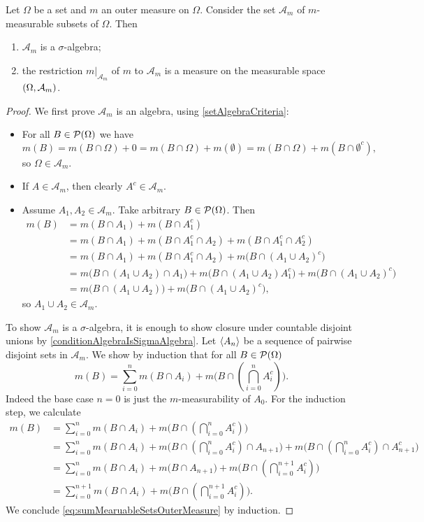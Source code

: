 \begin{theorem}
Let $\Omega$ be a set and $m$ an outer measure on $\Omega$. Consider the set $\mathcal{A}_m$ of $m$-measurable subsets of $\Omega$. Then
\begin{enumerate}
\item $\mathcal{A}_m$ is a $\sigma$-algebra;
\item the restriction $m|_{\mathcal{A}_m}$ of $m$ to $\mathcal{A}_m$ is a measure on the measurable space $\left( \Omega,\mathcal{A}_m \right)$.
\end{enumerate}
\end{theorem}
\begin{proof}
We first prove $\mathcal{A}_m$ is an algebra, using \ref{setAlgebraCriteria}:
\begin{itemize}
\item For all $B\in \operatorname{\mathcal{P}}(\Omega)$ we have
\[ m(B) = m(B\cap \Omega) + 0 = m(B\cap \Omega) + m(\emptyset) = m(B\cap \Omega) + m(B\cap \emptyset^c), \]
so $\Omega\in \mathcal{A}_m$.
\item If $A\in \mathcal{A}_m$, then clearly $A^c\in \mathcal{A}_m$.
\item Assume $A_1,A_2 \in \mathcal{A}_m$. Take arbitrary $B\in\operatorname{\mathcal{P}}(\Omega)$. Then
\begin{align*}
m(B) &= m(B\cap A_1) + m(B\cap A_1^c) \\
&= m(B\cap A_1) + m(B\cap A_1^c\cap A_2) + m(B\cap A_1^c\cap A_2^c) \\
&= m(B\cap A_1) + m(B\cap A_1^c\cap A_2) + m\big(B\cap (A_1\cup A_2)^c\big) \\
&= m\big(B\cap (A_1\cup A_2)\cap A_1\big) + m\big(B\cap (A_1\cup A_2)A_1^c\big) + m\big(B\cap (A_1\cup A_2)^c\big) \\
&= m\big(B\cap (A_1\cup A_2)\big) + m\big(B\cap (A_1\cup A_2)^c\big),
\end{align*}
so $A_1\cup A_2\in \mathcal{A}_m$.
\end{itemize}
To show $\mathcal{A}_m$ is a $\sigma$-algebra, it is enough to show closure under countable disjoint unions by \ref{conditionAlgebraIsSigmaAlgebra}. Let $\left\langle A_n \right\rangle$ be a sequence of pairwise disjoint sets in $\mathcal{A}_m$. We show by induction that for all $B\in \operatorname{\mathcal{P}}(\Omega)$
\begin{equation} m(B) = \sum_{i=0}^nm(B\cap A_i) + m\big(B\cap (\bigcap_{i=0}^nA_i^c)\big). \label{eq:sumMearuableSetsOuterMeasure}\end{equation}
Indeed the base case $n=0$ is just the $m$-measurability of $A_0$. For the induction step, we calculate
\begin{align*}
m(B) &= \sum_{i=0}^nm(B\cap A_i) + m\big(B\cap (\bigcap_{i=0}^nA_i^c)\big) \\
&= \sum_{i=0}^nm(B\cap A_i) + m\big(B\cap (\bigcap_{i=0}^nA_i^c)\cap A_{n+1}\big) + m\big(B\cap (\bigcap_{i=0}^nA_i^c)\cap A_{n+1}^c\big) \\
&= \sum_{i=0}^nm(B\cap A_i) + m\big(B\cap A_{n+1}\big) + m\big(B\cap (\bigcap_{i=0}^{n+1}A_i^c)\big) \\
&= \sum_{i=0}^{n+1}m(B\cap A_i) + m\big(B\cap (\bigcap_{i=0}^{n+1}A_i^c)\big).
\end{align*}
We conclude \eqref{eq:sumMearuableSetsOuterMeasure} by induction.


\end{proof}
